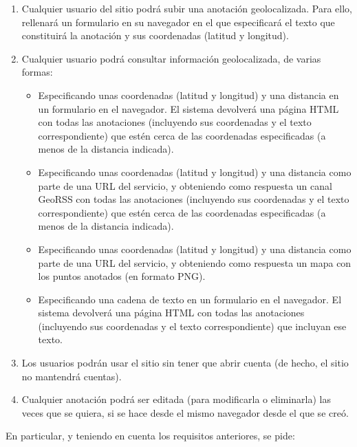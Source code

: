 {\begin{enumerate}
\item Cualquier usuario del sitio podrá subir una anotación
  geolocalizada. Para ello, rellenará un formulario en su navegador en el que
  especificará el texto que constituirá la anotación y sus
  coordenadas (latitud y longitud).
\item Cualquier usuario podrá consultar información
  geolocalizada, de varias formas:
  \begin{itemize}
  \item Especificando unas coordenadas (latitud y longitud) y una
    distancia en un formulario en el navegador. El sistema devolverá
    una página HTML con todas las anotaciones (incluyendo sus
    coordenadas y el texto correspondiente) que estén cerca de las
    coordenadas especificadas (a menos de la distancia indicada).
  \item Especificando unas coordenadas (latitud y longitud) y una
    distancia como parte de una URL del servicio, y obteniendo como
    respuesta un canal GeoRSS con todas las anotaciones (incluyendo sus
    coordenadas y el texto correspondiente) que estén cerca de las
    coordenadas especificadas (a menos de la distancia indicada).
  \item Especificando unas coordenadas (latitud y longitud) y una
    distancia como parte de una URL del servicio, y obteniendo como
    respuesta un mapa con los puntos anotados (en formato PNG).
  \item Especificando una cadena de texto en un formulario en el
    navegador. El sistema devolverá una página HTML con todas las
    anotaciones (incluyendo sus coordenadas y el texto
    correspondiente) que incluyan ese texto.
  \end{itemize}
\item Los usuarios podrán usar el sitio sin tener que abrir cuenta (de
  hecho, el sitio no mantendrá cuentas).
\item Cualquier anotación podrá ser editada (para modificarla o
  eliminarla) las veces que se quiera, si se hace desde el mismo
  navegador desde el que se creó.
\end{enumerate}

En particular, y teniendo en cuenta los requisitos anteriores,
se pide:

}
